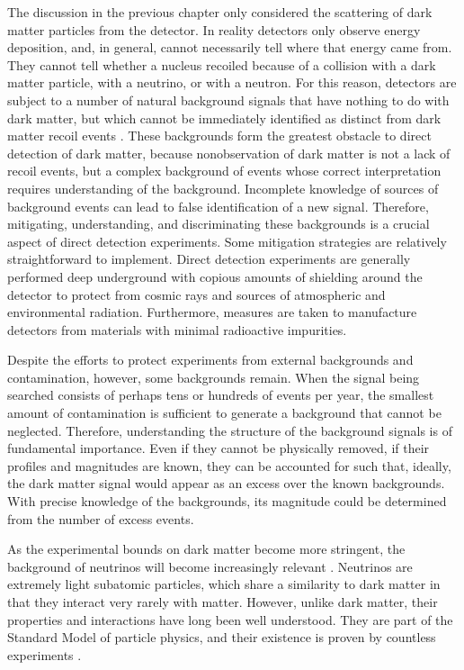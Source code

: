 The discussion in the previous chapter only considered the scattering of dark matter particles from the detector. In reality detectors only observe energy deposition, and, in general, cannot necessarily tell where that energy came from. They cannot tell whether a nucleus recoiled because of a collision with a dark matter particle, with a neutrino, or with a neutron. For this reason, detectors are subject to a number of natural background signals that have nothing to do with dark matter, but which cannot be immediately identified as distinct from dark matter recoil events \parencite{BaxterEtAl2022}. These backgrounds form the greatest obstacle to direct detection of dark matter, because nonobservation of dark matter is not a lack of recoil events, but a complex background of events whose correct interpretation requires understanding of the background. Incomplete knowledge of sources of background events can lead to false identification of a new signal. Therefore, mitigating, understanding, and discriminating these backgrounds is a crucial aspect of direct detection experiments. Some mitigation strategies are relatively straightforward to implement. Direct detection experiments are generally performed deep underground with copious amounts of shielding around the detector to protect from cosmic rays and sources of atmospheric and environmental radiation. Furthermore, measures are taken to manufacture detectors from materials with minimal radioactive impurities.

Despite the efforts to protect experiments from external backgrounds and contamination, however, some backgrounds remain. When the signal being searched consists of perhaps tens or hundreds of events per year, the smallest amount of contamination is sufficient to generate a background that cannot be neglected. Therefore, understanding the structure of the background signals is of fundamental importance. Even if they cannot be physically removed, if their profiles and magnitudes are known, they can be accounted for such that, ideally, the dark matter signal would appear as an excess over the known backgrounds. With precise knowledge of the backgrounds, its magnitude could be determined from the number of excess events.

As the experimental bounds on dark matter become more stringent, the background of neutrinos will become increasingly relevant \parencites{OHare2016, GaspertGiampaMorrissey2022}. Neutrinos are extremely light subatomic particles, which share a similarity to dark matter in that they interact very rarely with matter. However, unlike dark matter, their properties and interactions have long been well understood. They are part of the Standard Model of particle physics, and their existence is proven by countless experiments \parencites{AharmimEtAl2013, AnEtAl2017, BasilicoEtAl2023, AbbasiEtAl2024, AbeEtAl2024, AbratenkoEtAl2024}. 

